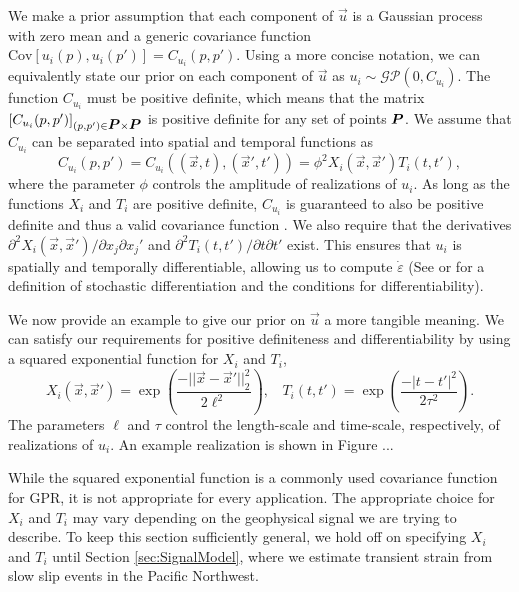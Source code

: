 \documentclass[extra,mreferee]{gji}
\begin{document}
We make a prior assumption that each component of $\vec{u}$ is a Gaussian process with zero mean and a generic covariance function $\mathrm{Cov}\left[u_i(p),u_i(p')\right] = C_{u_i}(p,p')$. Using a more concise notation, we can equivalently state our prior on each component of $\vec{u}$ as $u_i \sim \mathcal{GP}\left(0,C_{u_i}\right)$. The function $C_{u_i}$ must be positive definite, which means that the matrix $[C_{u_i}(p,p')]_{(p,p') \in \mitbf{P} \times \mitbf{P}}$ is positive definite for any set of points $\mitbf{P}$. We assume that $C_{u_i}$ can be separated into spatial and temporal functions as 
\begin{equation}\label{eq:TransientCovariance}
C_{u_i}(p,p') = C_{u_i}\left((\vec{x},t),(\vec{x}',t')\right) = \phi^2 X_i(\vec{x},\vec{x}')T_i(t,t'),
\end{equation}   
where the parameter $\phi$ controls the amplitude of realizations of $u_i$. As long as the functions $X_i$ and $T_i$ are positive definite, $C_{u_i}$ is guaranteed to also be positive definite and thus a valid covariance function \citep[sec. 4.2.4]{Rasmussen2006}. We also require that the derivatives $\partial^2 X_i(\vec{x},\vec{x}')/ \partial x_j \partial x_j'$ and $\partial^2 T_i(t,t') / \partial t \partial t'$ exist. This ensures that $u_i$ is spatially and temporally differentiable, allowing us to compute $\dot\varepsilon$ (See \citet[sec. 2.2]{Adler1981} or \citet[sec. 10A]{Papoulis1991} for a definition of stochastic differentiation and the conditions for differentiability). 

We now provide an example to give our prior on $\vec{u}$ a more tangible meaning. We can satisfy our requirements for positive definiteness and differentiability by using a squared exponential function for $X_i$ and $T_i$,
\begin{equation}\label{eq:ExampleCov}
X_i(\vec{x},\vec{x}') = \exp\left(\frac{-||\vec{x} - \vec{x}'||_2^2}{2\ell^2}\right), \ \ \ \ T_i(t,t') = \exp\left(\frac{-|t - t'|^2}{2\tau^2}\right).
\end{equation}
The parameters $\ell$ and $\tau$ control the length-scale and time-scale, respectively, of realizations of $u_i$. An example realization is shown in Figure ...


While the squared exponential function is a commonly used covariance function for GPR, it is not appropriate for every application. The appropriate choice for $X_i$ and $T_i$ may vary depending on the geophysical signal we are trying to describe. To keep this section sufficiently general, we hold off on specifying $X_i$ and $T_i$ until Section \ref{sec:SignalModel}, where we estimate transient strain from slow slip events in the Pacific Northwest. 
\end{document}
